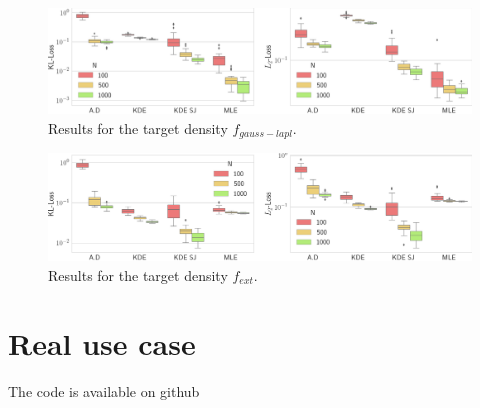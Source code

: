 \begin{figure}
    \includegraphics[width=\textwidth]{./TeX_files/full_results_lapl_gauss.png}
    \caption{Results for the target density $f_{gauss-lapl}$.}
    \label{fig:res_lapl_gauss_weight_estim}
\end{figure}

\begin{figure}
    \includegraphics[width=\textwidth]{./TeX_files/full_results_lapl_gauss_not_dict.png}
    \caption{Results for the target density $f_{ext}$.}
    \label{fig:res_lapl_gauss_not_dict_weight_estim}
\end{figure}

\section{Real use case}

The code is available on github